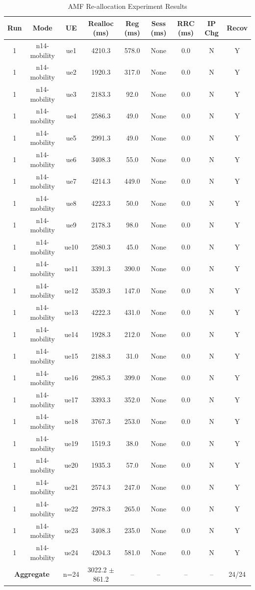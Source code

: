 \begin{table}[ht]
\centering
\begin{tabular}{|c|c|c|c|c|c|c|c|c|}
\hline
Run & Mode & UE & Realloc (ms) & Reg (ms) & Sess (ms) & RRC (ms) & IP Chg & Recov \\
\hline
1 & n14-mobility & ue1 & 4210.3 & 578.0 & None & 0.0 & N & Y \\
1 & n14-mobility & ue2 & 1920.3 & 317.0 & None & 0.0 & N & Y \\
1 & n14-mobility & ue3 & 2183.3 & 92.0 & None & 0.0 & N & Y \\
1 & n14-mobility & ue4 & 2586.3 & 49.0 & None & 0.0 & N & Y \\
1 & n14-mobility & ue5 & 2991.3 & 49.0 & None & 0.0 & N & Y \\
1 & n14-mobility & ue6 & 3408.3 & 55.0 & None & 0.0 & N & Y \\
1 & n14-mobility & ue7 & 4214.3 & 449.0 & None & 0.0 & N & Y \\
1 & n14-mobility & ue8 & 4223.3 & 50.0 & None & 0.0 & N & Y \\
1 & n14-mobility & ue9 & 2178.3 & 98.0 & None & 0.0 & N & Y \\
1 & n14-mobility & ue10 & 2580.3 & 45.0 & None & 0.0 & N & Y \\
1 & n14-mobility & ue11 & 3391.3 & 390.0 & None & 0.0 & N & Y \\
1 & n14-mobility & ue12 & 3539.3 & 147.0 & None & 0.0 & N & Y \\
1 & n14-mobility & ue13 & 4222.3 & 431.0 & None & 0.0 & N & Y \\
1 & n14-mobility & ue14 & 1928.3 & 212.0 & None & 0.0 & N & Y \\
1 & n14-mobility & ue15 & 2188.3 & 31.0 & None & 0.0 & N & Y \\
1 & n14-mobility & ue16 & 2985.3 & 399.0 & None & 0.0 & N & Y \\
1 & n14-mobility & ue17 & 3393.3 & 352.0 & None & 0.0 & N & Y \\
1 & n14-mobility & ue18 & 3767.3 & 253.0 & None & 0.0 & N & Y \\
1 & n14-mobility & ue19 & 1519.3 & 38.0 & None & 0.0 & N & Y \\
1 & n14-mobility & ue20 & 1935.3 & 57.0 & None & 0.0 & N & Y \\
1 & n14-mobility & ue21 & 2574.3 & 247.0 & None & 0.0 & N & Y \\
1 & n14-mobility & ue22 & 2978.3 & 265.0 & None & 0.0 & N & Y \\
1 & n14-mobility & ue23 & 3408.3 & 235.0 & None & 0.0 & N & Y \\
1 & n14-mobility & ue24 & 4204.3 & 581.0 & None & 0.0 & N & Y \\
\multicolumn{2}{|c|}{\textbf{Aggregate}} & n=24 & 3022.2 $\pm$ 861.2 & -- & -- & -- & -- & 24/24 \\
\hline
\end{tabular}
\caption{AMF Re-allocation Experiment Results}
\label{tab:amf_realloc}
\end{table}
